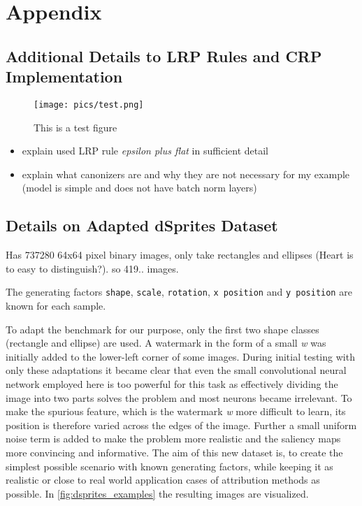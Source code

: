 \chapter{Appendix}\label{chapter:Appendix}


\section{Additional Details to LRP Rules and CRP Implementation}
\label{appendix:lrprules}
\begin{figure}[ht]
	\centering
	\label{fig:tesfigure}
	\texttt{[image: pics/test.png]}
	\caption[Test Figure]{This is a test figure}
\end{figure}
\begin{itemize}
    \item explain used LRP rule \textit{epsilon plus flat} in sufficient detail
    \item explain what canonizers are and why they are not necessary for my example (model is simple and does not have batch norm layers) 
\end{itemize}


\section{Details on Adapted dSprites Dataset}\label{appendix:dsprites}
Has 737280 64x64 pixel binary images, only take rectangles and ellipses (Heart is to easy to distinguish?). so 419.. images.

The generating factors \verb|shape|, \verb|scale|, \verb|rotation|, \verb|x position| and \verb|y position| are known for each sample.

To adapt the benchmark for our purpose, only the first two shape classes (rectangle and ellipse) are used. A watermark in the form of a small \textit{w} was initially added to the lower-left corner of some images. During initial testing with only these adaptations it became clear that even the small convolutional neural network employed here is too powerful for this task as effectively dividing the image into two parts solves the problem and most neurons became irrelevant.
To make the spurious feature, which is the watermark \textit{w} more difficult to learn, its position is therefore varied across the edges of the image. Further a small uniform noise term is added to make the problem more realistic and the saliency maps more convincing and informative.
The aim of this new dataset is, to create the simplest possible scenario with known generating factors, while keeping it as realistic or close to real world application cases of attribution methods as possible. In \autoref{fig:dsprites_examples} the resulting images are visualized.


